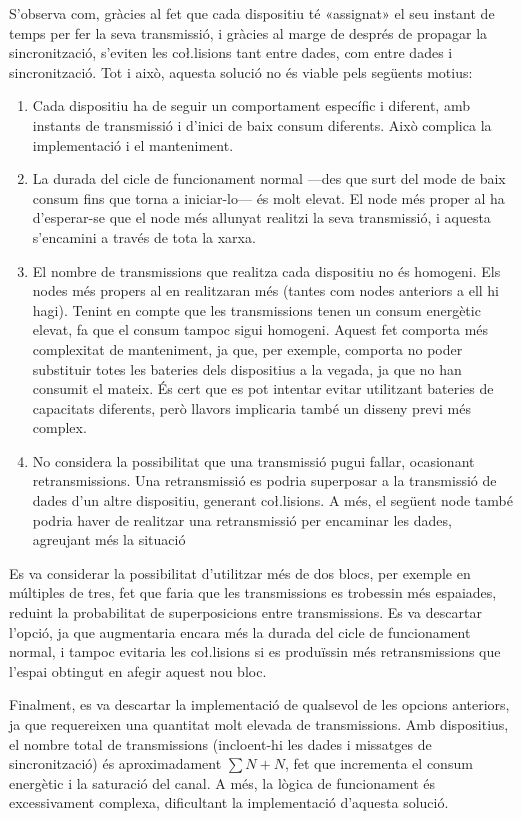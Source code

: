 \documentclass{tfgitic}[2024/07/01]
\begin{document}
{S'observa com, gràcies al fet que cada dispositiu té «assignat» el seu instant de temps per fer la seva transmissió, i gràcies al marge de després de propagar la sincronització, s'eviten les co\l.lisions tant entre dades, com entre dades i sincronització. Tot i això, aquesta solució no és viable pels següents motius:
\begin{enumerate}
    \item Cada dispositiu ha de seguir un comportament específic i diferent, amb instants de transmissió i d'inici de baix consum diferents. Això complica la implementació i el manteniment.
    \item La durada del cicle de funcionament normal ---des que surt del mode de baix consum fins que torna a iniciar-lo--- és molt elevat. El node més proper al  ha d'esperar-se que el node més allunyat realitzi la seva transmissió, i aquesta s'encamini a través de tota la xarxa.  
    \item El nombre de transmissions que realitza cada dispositiu no és homogeni. Els nodes més propers al  en realitzaran més (tantes com nodes anteriors a ell hi hagi). Tenint en compte que les transmissions tenen un consum energètic elevat, fa que el consum tampoc sigui homogeni. Aquest fet comporta més complexitat de manteniment, ja que, per exemple, comporta no poder substituir totes les bateries dels dispositius a la vegada, ja que no han consumit el mateix. És cert que es pot intentar evitar utilitzant bateries de capacitats diferents, però llavors implicaria també un disseny previ més complex.
    \item No considera la possibilitat que una transmissió pugui fallar, ocasionant retransmissions. Una retransmissió es podria superposar a la transmissió de dades d'un altre dispositiu, generant co\l.lisions. A més, el següent node també podria haver de realitzar una retransmissió per encaminar les dades, agreujant més la situació 
\end{enumerate}

Es va considerar la possibilitat d'utilitzar més de dos blocs, per exemple en múltiples de tres, fet que faria que les transmissions es trobessin més espaiades, reduint la probabilitat de superposicions entre transmissions. Es va descartar l'opció, ja que augmentaria encara més la durada del cicle de funcionament normal, i tampoc evitaria les co\l.lisions si es produïssin més retransmissions que l'espai obtingut en afegir aquest nou bloc.

Finalment, es va descartar la implementació de qualsevol de les opcions anteriors, ja que requereixen una quantitat molt elevada de transmissions. Amb  dispositius, el nombre total de transmissions (incloent-hi les dades i missatges de sincronització) és aproximadament $\sum{N} + N$, fet que incrementa el consum energètic i la saturació del canal. A més, la lògica de funcionament és excessivament complexa, dificultant la implementació d'aquesta solució. 

}
\end{document}
